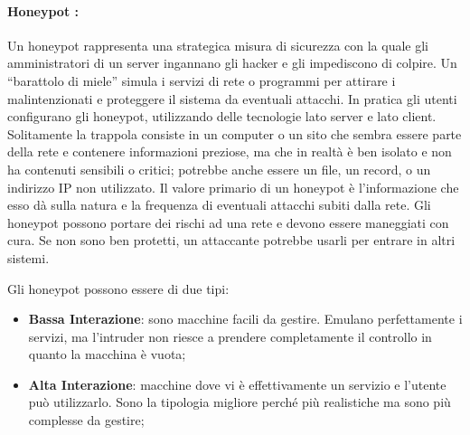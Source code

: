 \paragraph{Honeypot {\normalfont {}}:}
Un honeypot rappresenta una strategica misura di sicurezza con la quale gli
amministratori
di un server ingannano gli hacker e gli impediscono di colpire.
Un “barattolo di miele” simula i
servizi di rete o programmi per attirare i malintenzionati e proteggere il
sistema da eventuali
attacchi. In pratica gli utenti configurano gli honeypot, utilizzando delle
tecnologie lato server e lato
client. Solitamente la trappola consiste in un computer o un sito che sembra
essere parte della rete
e contenere informazioni preziose, ma che in realtà è ben isolato e non ha
contenuti sensibili o
critici; potrebbe anche essere un file, un record, o un indirizzo IP non utilizzato.
Il valore primario di un honeypot è l'informazione che esso dà sulla natura e la
frequenza di
eventuali attacchi subiti dalla rete.
Gli honeypot possono portare dei rischi ad una rete e devono essere maneggiati
con cura. Se non
sono ben protetti, un attaccante potrebbe usarli per entrare in altri sistemi.

Gli honeypot possono essere di due tipi:
\begin{itemize}
      \item \textbf{Bassa Interazione}: sono macchine facili da gestire. Emulano perfettamente
            i servizi, ma l'intruder non riesce a prendere completamente il controllo in
            quanto la macchina è vuota;
      \item \textbf{Alta Interazione}: macchine dove vi è effettivamente un servizio e
            l'utente può utilizzarlo.
            Sono la tipologia migliore perché più realistiche ma sono più complesse
            da gestire;
\end{itemize}